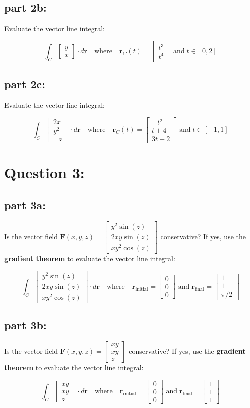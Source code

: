 \documentclass{article}
\newcommand{\colxyvec}[2]{\begin{bmatrix} #1 \\ #2 \end{bmatrix}}
\newcommand{\colvec}[3]{\begin{bmatrix} #1 \\ #2 \\ #3 \end{bmatrix}}
\begin{document}
\subsection*{part 2b:}

Evaluate the vector line integral: 

\[\int_C \colxyvec{y}{x} \cdot d\mathbf{r} \quad\text{where}\quad \mathbf{r}_C(t) = \colxyvec{t^3}{t^4} \;\text{and}\; t \in [0,2]\]


\subsection*{part 2c:}

Evaluate the vector line integral: 

\[\int_C \colvec{2x}{y^2}{-z} \cdot d\mathbf{r} \quad\text{where}\quad \mathbf{r}_C(t) = \colvec{-t^2}{t+4}{3t+2} \;\text{and}\; t \in [-1,1]\]




\section*{Question 3:}

\subsection*{part 3a:}

Is the vector field \(\mathbf{F}(x,y,z) = \colvec{y^2\sin(z)}{2xy\sin(z)}{xy^2\cos(z)}\) conservative? If yes, use the {\bf gradient theorem} to evaluate the vector line integral:

\[\int_C \colvec{y^2\sin(z)}{2xy\sin(z)}{xy^2\cos(z)} \cdot d\mathbf{r} \quad\text{where}\quad \mathbf{r}_\text{initial} = \colvec{0}{0}{0} \;\text{and}\; \mathbf{r}_\text{final} = \colvec{1}{1}{\pi/2}\] 


\subsection*{part 3b:}

Is the vector field \(\mathbf{F}(x,y,z) = \colvec{xy}{xy}{z}\) conservative? If yes, use the {\bf gradient theorem} to evaluate the vector line integral:

\[\int_C \colvec{xy}{xy}{z} \cdot d\mathbf{r} \quad\text{where}\quad \mathbf{r}_\text{initial} = \colvec{0}{0}{0} \;\text{and}\; \mathbf{r}_\text{final} = \colvec{1}{1}{1}\] 
\end{document}

